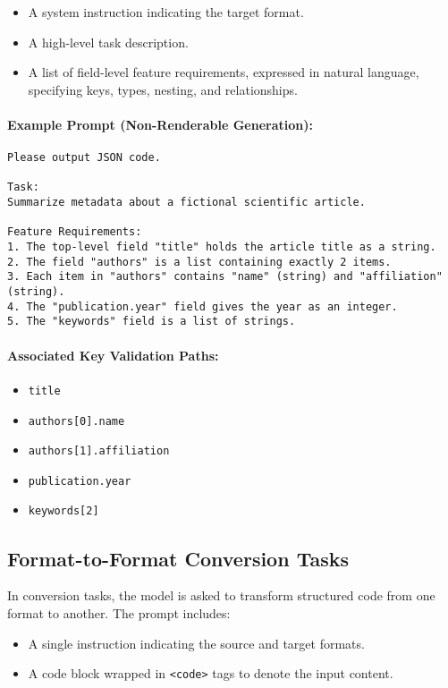 \begin{itemize}
    \item A system instruction indicating the target format.
    \item A high-level task description.
    \item A list of field-level feature requirements, expressed in natural language, specifying keys, types, nesting, and relationships.
\end{itemize}

\paragraph{Example Prompt (Non-Renderable Generation):}
\begin{lstlisting}[breaklines=true, basicstyle=\ttfamily\small]
Please output JSON code.

Task:
Summarize metadata about a fictional scientific article.

Feature Requirements:
1. The top-level field "title" holds the article title as a string.
2. The field "authors" is a list containing exactly 2 items.
3. Each item in "authors" contains "name" (string) and "affiliation" (string).
4. The "publication.year" field gives the year as an integer.
5. The "keywords" field is a list of strings.
\end{lstlisting}

\paragraph{Associated Key Validation Paths:}
\begin{itemize}
    \item \texttt{title}
    \item \texttt{authors[0].name}
    \item \texttt{authors[1].affiliation}
    \item \texttt{publication.year}
    \item \texttt{keywords[2]}
\end{itemize}

\subsection{Format-to-Format Conversion Tasks}

In conversion tasks, the model is asked to transform structured code from one format to another. The prompt includes:

\begin{itemize}
    \item A single instruction indicating the source and target formats.
    \item A code block wrapped in \texttt{<code>} tags to denote the input content.
\end{itemize}

